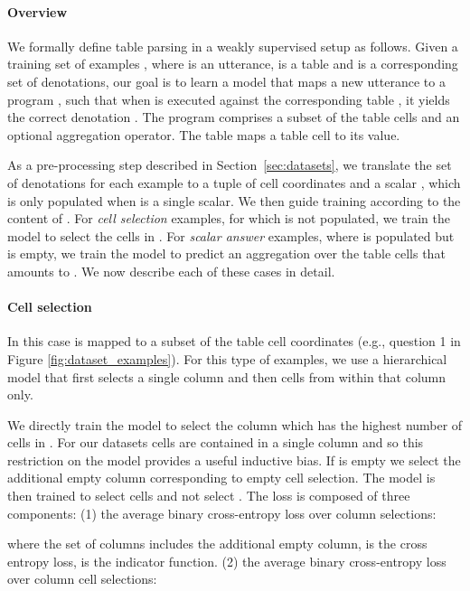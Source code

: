 \documentclass[11pt,a4paper]{article}
\begin{document}
\paragraph{Overview}
 
We formally define table parsing in a weakly supervised setup as follows. Given a training set of 
examples , where  is an utterance,  is a table and  is a corresponding set of denotations, our goal is to learn a model that maps a new utterance  to a program , such that when  is executed against the corresponding table , it yields the correct denotation . The program  comprises a subset of the table cells and an optional aggregation operator. The table  maps a table cell to its value.

As a pre-processing step described in Section~\ref{sec:datasets}, we translate the set of denotations  for each example to a tuple  of cell coordinates  and a scalar , which is only populated when  is a single scalar.
We then guide training according to the content of . For \textit{cell selection} examples, for which  is not populated, we train the model to select the cells in . For \textit{scalar answer} examples, where  is populated but  is empty, we train the model to predict an aggregation over the table cells that amounts to . We now describe each of these cases in detail. 

\paragraph{Cell selection} In this case  is mapped to a subset of the table cell coordinates  (e.g., question 1 in Figure \ref{fig:dataset_examples}). For this type of examples, we use a hierarchical model that first selects a single column and then cells from within that column only. 

We directly train the model to select the column  which has the highest number of cells in . For our datasets cells  are contained in a single column and so this restriction on the model provides a useful inductive bias. If  is empty we select the additional empty column corresponding to empty cell selection.
The model is then trained to select cells  and not select . The loss is composed of three components: (1) the average binary cross-entropy loss over column selections:

where the set of columns  includes the additional empty column,  is the cross entropy loss,  is the indicator function.
(2) the average binary cross-entropy loss over column cell selections:
\end{document}
